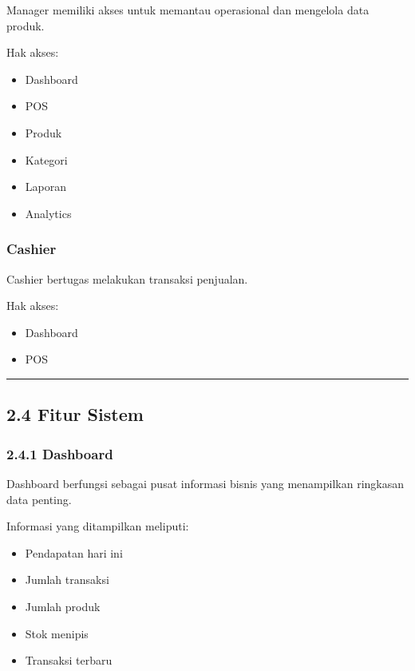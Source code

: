 Manager memiliki akses untuk memantau operasional dan mengelola data produk.

Hak akses:

\begin{itemize}
\tightlist
\item
  Dashboard
\item
  POS
\item
  Produk
\item
  Kategori
\item
  Laporan
\item
  Analytics
\end{itemize}

\subsubsection{Cashier}\label{cashier}

Cashier bertugas melakukan transaksi penjualan.

Hak akses:

\begin{itemize}
\tightlist
\item
  Dashboard
\item
  POS
\end{itemize}

\begin{center}\rule{0.5\linewidth}{0.5pt}\end{center}

\subsection{2.4 Fitur Sistem}\label{fitur-sistem}

\subsubsection{2.4.1 Dashboard}\label{dashboard}

Dashboard berfungsi sebagai pusat informasi bisnis yang menampilkan ringkasan data penting.

Informasi yang ditampilkan meliputi:

\begin{itemize}
\tightlist
\item
  Pendapatan hari ini
\item
  Jumlah transaksi
\item
  Jumlah produk
\item
  Stok menipis
\item
  Transaksi terbaru
\end{itemize}

